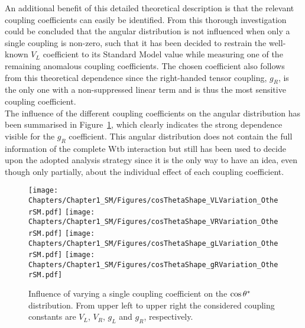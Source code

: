 An additional benefit of this detailed theoretical description is that the relevant coupling coefficients can easily be identified. From this thorough investigation could be concluded that the angular distribution is not influenced when only a single coupling is non-zero, such that it has been decided to restrain the well-known $V_L$ coefficient to its Standard Model value while measuring one of the remaining anomalous coupling coefficients. The chosen coefficient also follows from this theoretical dependence since the right-handed tensor coupling, $g_R$, is the only one with a non-suppressed linear term and is thus the most sensitive coupling coefficient.
\\
The influence of the different coupling coefficients on the angular distribution has been summarised in Figure~\ref{fig::CsThInfluence}, which clearly indicates the strong dependence visible for the $g_R$ coefficient. This angular distribution does not contain the full information of the complete Wtb interaction but still has been used to decide upon the adopted analysis strategy since it is the only way to have an idea, even though only partially, about the individual effect of each coupling coefficient.
\begin{figure}[h!t]
 \centering
 \texttt{[image: Chapters/Chapter1\_SM/Figures/cosThetaShape\_VLVariation\_OtherSM.pdf]}
 \texttt{[image: Chapters/Chapter1\_SM/Figures/cosThetaShape\_VRVariation\_OtherSM.pdf]}
 \texttt{[image: Chapters/Chapter1\_SM/Figures/cosThetaShape\_gLVariation\_OtherSM.pdf]}
 \texttt{[image: Chapters/Chapter1\_SM/Figures/cosThetaShape\_gRVariation\_OtherSM.pdf]}
 \caption{Influence of varying a single coupling coefficient on the $\cos \theta^{*}$ distribution. From upper left to upper right the considered coupling constants are $V_L$, $V_R$, $g_L$ and $g_R$, respectively.}
 \label{fig::CsThInfluence}
\end{figure}

